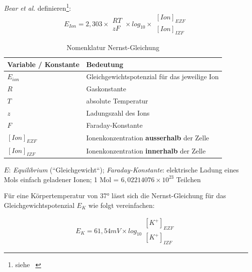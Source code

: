 \textit{Bear et al.} definieren\footnote{siehe ~\cite[74, Exkurs 3.2]{BCP18}}:
\begin{equation}
    E_{Ion} = 2,303  \times \begin{matrix} RT \\ \hline zF \end{matrix} \times log_{10} \times \begin{matrix} [Ion]_{EZF} \\ \hline [Ion]_{IZF} \end{matrix}
    \label{eq:gl-nernst}
\end{equation}



{\renewcommand{\arraystretch}{1.5}%
\begin{table} %
    \begin{center}
        \begin{tabular}{l |l }
            \textbf{Variable / Konstante} & \textbf{Bedeutung}  \\
            \hline
            $E_{ion}$            & Gleichgewichtspotenzial für das jeweilige Ion \\
            $R$                  & Gaskonstante \\
            $T$                  & absolute Temperatur \\
            $z$                  & Ladungszahl des Ions \\
            $F$                  & Faraday-Konstante \\
            $[Ion]_{EZF}$        & Ionenkonzentration \textbf{ausserhalb} der Zelle \\
            $[Ion]_{IZF}$        & Ionenkonzentration \textbf{innerhalb} der Zelle \\
        \end{tabular}
        \caption{Nomenklatur Nernst-Gleichung}
        \label{tab:nernstkonstanten}
    \end{center}
    \small{
        $E$: \textit{Equilibrium} (``Gleichgewicht``); \textit{Faraday-Konstante}: elektrische Ladung eines Mols einfach geladener Ionen; 1 Mol = $6,02214076 \times 10^{23}$ Teilchen

    }

\end{table}

\noindent
Für eine Körpertemperatur von 37° lässt sich die Nernst-Gleichung für das Gleichgewichtspotenzial $E_K$ wie folgt vereinfachen:

\begin{equation}
    E_{K} = 61,54 mV  \times log_{10} \begin{matrix} [K^+]_{EZF} \\ \hline [K^+]_{IZF} \end{matrix}
    \label{eq:gl-nernst-reduced-start}
\end{equation}

}
